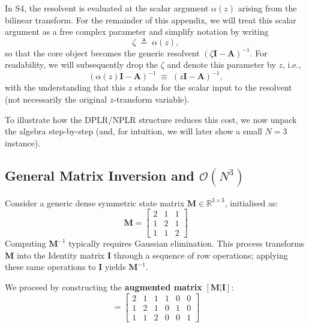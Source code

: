 \documentclass[a4paper,11pt]{article}
\begin{document}
In S4, the resolvent is evaluated at the scalar argument $\alpha(z)$ arising from the bilinear transform. 
For the remainder of this appendix, we will treat this scalar argument as a free complex parameter and simplify notation by writing
\[
\zeta \;\triangleq\; \alpha(z),
\]
so that the core object becomes the generic resolvent $(\zeta\mathbf{I}-\mathbf{A})^{-1}$. 
For readability, we will subsequently drop the $\zeta$ and denote this parameter by $z$, i.e.,
\[
(\alpha(z)\mathbf{I}-\mathbf{A})^{-1}\;\equiv\; (z\mathbf{I}-\mathbf{A})^{-1},
\]
with the understanding that this $z$ stands for the scalar input to the resolvent (not necessarily the original $z$-transform variable).

To illustrate how the DPLR/NPLR structure reduces this cost, we now unpack the algebra step-by-step (and, for intuition, we will later show a small $N=3$ instance).


\subsection{General Matrix Inversion and \texorpdfstring{$\mathcal{O}(N^3)$}{O(N^3)}}
\label{sec:general_inversion}

Consider a generic dense symmetric state matrix $\mathbf{M} \in \mathbb{R}^{3\times3}$, initialised as:
\begin{equation}\label{eq:matrix_example}
    \mathbf{M} = \begin{bmatrix}
    2 & 1 & 1 \\
    1 & 2 & 1 \\
    1 & 1 & 2
    \end{bmatrix}
\end{equation}
Computing $\mathbf{M}^{-1}$ typically requires Gaussian elimination. This process transforms $\mathbf{M}$ into the Identity matrix $\mathbf{I}$ through a sequence of row operations; applying these same operations to $\mathbf{I}$ yields $\mathbf{M}^{-1}$.

We proceed by constructing the \textbf{augmented matrix} $[\mathbf{M}|\mathbf{I}]$:
\begin{equation}
    [\mathbf{M}|\mathbf{I}] = \left[
    \begin{array}{ccc|ccc}
    2 & 1 & 1 & 1 & 0 & 0 \\
    1 & 2 & 1 & 0 & 1 & 0 \\
    1 & 1 & 2 & 0 & 0 & 1
    \end{array}
    \right]
\end{equation}
\end{document}
